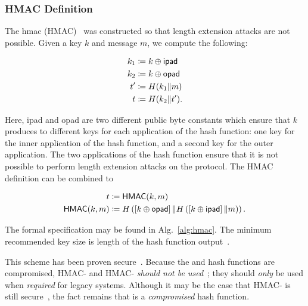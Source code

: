 \subsubsection{HMAC Definition}

The \gls{hmac} (HMAC)~\cite{HMAC1996,rfc2104}
was constructed so that length extension attacks are not possible.
Given a key $k$ and message $m$,
we compute the following:

\begin{align}
    k_{1} &\coloneqq{} k\oplus\textsf{ipad} \nonumber\\
    k_{2} &\coloneqq{} k\oplus\textsf{opad} \nonumber\\
    t' &\coloneqq{} H(k_{1}\|m) \nonumber\\
    t &\coloneqq{} H(k_{2}\|t').
\end{align}



\noindent
Here, \textsf{ipad} and \textsf{opad} are two different public
byte constants which ensure that $k$ produces to different
keys for each application of the \gls{hash function}:
one key for the inner application of the \gls{hash function},
and a second key for the outer application.
The two applications of the \gls{hash function} ensure that
it is not possible to perform length extension attacks on the protocol.
The HMAC definition can be combined to

\begin{align}
    t &\coloneqq{} \textsf{HMAC}(k, m) \nonumber\\
    \textsf{HMAC}(k, m) &\coloneqq{}
    H\left( \left[ k\oplus\textsf{opad} \right]\|
        H\left( \left[ k\oplus\textsf{ipad} \right]\|m \right) \right).
\end{align}

\noindent
The formal specification may be found in
Alg.~\ref{alg:hmac}.
The minimum recommended key size is length of the hash function
output~\cite{rfc2104}.

This scheme has been proven secure~\cite{cryptoeprint:2014:578}.
Because the \MDFive{} and \ShaOne{} \glspl{hash function} are compromised,
HMAC-\MDFive{} and HMAC-\ShaOne{}
\emph{should not be used}~\cite{cryptoeprint:2006:187,rfc6151};
they should \emph{only} be used when \emph{required} for legacy systems.
Although it may be the case that HMAC-\ShaOne{}
is still secure~\cite[Section 3.3]{rfc6194},
the fact remains that \ShaOne{} is a \emph{compromised} \gls{hash function}.

